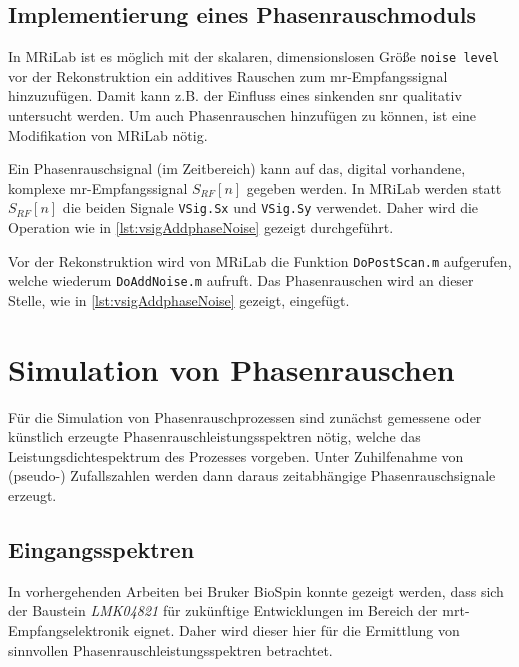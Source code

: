 \subsection{Implementierung eines Phasenrauschmoduls}
In MRiLab ist es möglich mit der skalaren, dimensionslosen Größe \texttt{noise level} vor der Rekonstruktion ein additives Rauschen zum \gls{mr}-Empfangssignal hinzuzufügen. Damit kann z.B. der Einfluss eines sinkenden \gls{snr} qualitativ untersucht werden. Um auch Phasenrauschen hinzufügen zu können, ist eine Modifikation von MRiLab nötig.

Ein Phasenrauschsignal (im Zeitbereich) kann auf das, digital vorhandene, komplexe \gls{mr}-Empfangssignal $S_{RF}[n]$ gegeben werden. In MRiLab werden statt $S_{RF}[n]$ die beiden Signale \texttt{VSig.Sx} und \texttt{VSig.Sy} verwendet. Daher wird die Operation wie in \autoref{lst:vsigAddphaseNoise} gezeigt durchgeführt.

Vor der Rekonstruktion wird von MRiLab die Funktion \texttt{DoPostScan.m} aufgerufen, welche wiederum \texttt{DoAddNoise.m} aufruft. Das Phasenrauschen wird an dieser Stelle, wie in \autoref{lst:vsigAddphaseNoise} gezeigt, eingefügt.










\section{Simulation von Phasenrauschen}
Für die Simulation von Phasenrauschprozessen sind zunächst gemessene oder künstlich erzeugte Phasenrauschleistungsspektren nötig, welche das Leistungsdichtespektrum des Prozesses vorgeben. Unter Zuhilfenahme von (pseudo-) Zufallszahlen werden dann daraus zeitabhängige Phasenrauschsignale erzeugt.

\subsection{Eingangsspektren}
\label{subsec:Eingangsspektren}
In vorhergehenden Arbeiten bei Bruker BioSpin konnte gezeigt werden, dass sich der Baustein \textit{LMK04821} für zukünftige Entwicklungen im Bereich der \gls{mrt}-Empfangselektronik eignet. Daher wird dieser hier für die Ermittlung von sinnvollen Phasenrauschleistungsspektren betrachtet.


